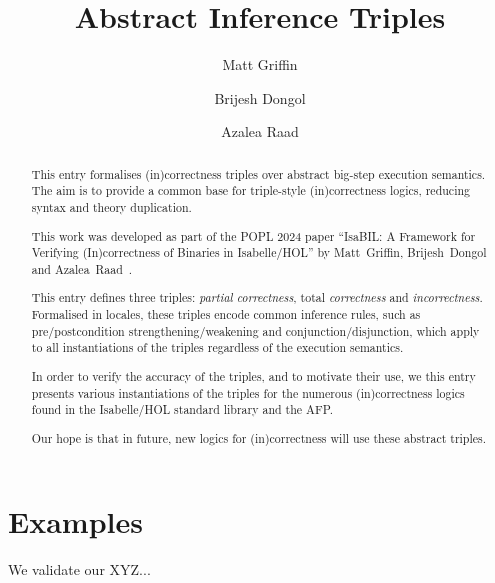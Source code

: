 \documentclass[11pt,a4paper]{article}
\begin{document}
\title{Abstract Inference Triples}
\author{Matt Griffin \and Brijesh Dongol \and Azalea Raad}
\maketitle

\begin{abstract}
  This entry formalises (in)correctness triples over abstract big-step execution semantics. 
  The aim is to provide a common base for triple-style (in)correctness logics, reducing syntax and 
  theory duplication.

  This work was developed as part of the POPL 2024 paper ``IsaBIL: A Framework for Verifying 
  (In)correctness of Binaries in Isabelle/HOL'' by Matt~Griffin, Brijesh~Dongol and 
  Azalea~Raad~\cite{LNCS2283}.

  This entry defines three triples: \emph{partial correctness}, total \emph{correctness} and \emph{incorrectness}.
  Formalised in locales, these triples encode common inference rules, such as pre/postcondition 
  strengthening/weakening and conjunction/disjunction, which apply to all instantiations of the 
  triples regardless of the execution semantics.

  In order to verify the accuracy of the triples, and to motivate their use, we this entry presents 
  various instantiations of the triples for the numerous (in)correctness logics found
  in the Isabelle/HOL standard library and the AFP.

  Our hope is that in future, new logics for (in)correctness will use these abstract triples.

\end{abstract}

\tableofcontents



\section{Examples}

We validate our XYZ...



\end{document}

